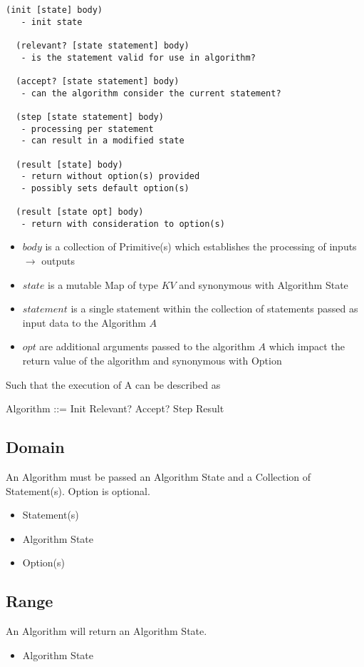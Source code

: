 \documentclass[../main.tex]{subfiles}
\begin{document}
\begin{lstlisting}[frame=single]
  (init [state] body)
   - init state

  (relevant? [state statement] body)
   - is the statement valid for use in algorithm?

  (accept? [state statement] body)
   - can the algorithm consider the current statement?

  (step [state statement] body)
   - processing per statement
   - can result in a modified state

  (result [state] body)
   - return without option(s) provided
   - possibly sets default option(s)

  (result [state opt] body)
   - return with consideration to option(s)
\end{lstlisting}
\begin{itemize}
\item $body$ is a collection of Primitive(s) which establishes the processing of inputs $\to$ outputs
\item $state$ is a mutable Map of type $KV$ and synonymous with Algorithm State
\item $statement$ is a single statement within the collection of statements passed as input data to the Algorithm $A$
\item $opt$ are additional arguments passed to the algorithm $A$ which impact the return value of the algorithm and synonymous with Option
\end{itemize}
Such that the execution of A can be described as
\begin{zed}
  Algorithm ::= Init \semi Relevant? \semi Accept? \semi Step \semi Result
\end{zed}
\subsection{Domain}
An Algorithm must be passed an Algorithm State and a Collection of Statement(s). Option is optional.
\begin{itemize}
\item Statement(s)
\item Algorithm State
\item Option(s)
\end{itemize}

\subsection{Range}
An Algorithm will return an Algorithm State.
\begin{itemize}
\item Algorithm State
\end{itemize}
\end{document}
